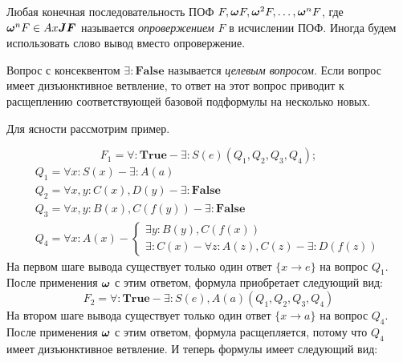 %
Любая конечная последовательность ПОФ $F, \boldsymbol{\omega} F, \boldsymbol{\omega}^2 F,\ldots,\boldsymbol{\omega}^n F$, где $\boldsymbol{\omega}^n F \in Ax\boldsymbol{JF}$ называется {\em опровержением} $F$ в исчислении ПОФ. Иногда будем использовать слово вывод вместо опровержение.

Вопрос с консеквентом $\exists:\boldsymbol{False}$ называется {\em целевым вопросом}. Если вопрос имеет дизъюнктивное ветвление, то ответ на этот вопрос приводит к расщеплению соответствующей базовой подформулы на несколько новых.

Для ясности рассмотрим пример.

\begin{example}\label{proofexample}


\begin{equation*}\label{ex:f1}
	F_1 = \forall\colon\boldsymbol{True} - \exists\colon S(e)(Q_1,Q_2,Q_3,Q_4);
\end{equation*}
\begin{equation*}
	\begin{array}{l}
	Q_1 = \forall x\colon S(x) - \exists\colon A(a) \\
	Q_2 = \forall x,y\colon C(x),D(y) - \exists\colon\boldsymbol{False} \\
	Q_3 = \forall x,y\colon B(x),C(f(y)) - \exists\colon\boldsymbol{False} \\
	Q_4 =
	\forall x\colon A(x) -
	\left\lbrace
	\begin{array}{l}
		\exists y\colon B(y),C(f(x)) \\
		\exists \colon C(x) - \forall z\colon A(z),C(z) - \exists\colon D(f(z))
	\end{array}\right.
	\end{array}
\end{equation*}
На первом шаге вывода существует только один ответ $\{x \rightarrow e\}$ на вопрос $Q_1$. После применения $\boldsymbol{\omega}$ с этим ответом, формула приобретает следующий вид:
\begin{equation*}\label{ex:f2}
	F_2 = \forall\colon\boldsymbol{True} - \exists\colon S(e),A(a)(Q_1,Q_2,Q_3,Q_4)
\end{equation*}
На втором шаге вывода существует только один ответ $\{x \rightarrow a\}$ на вопрос $Q_4$. После применения $\boldsymbol{\omega}$ с этим ответом, формула расщепляется, потому что $Q_4$ имеет дизъюнктивное ветвление. И теперь формулы имеет следующий вид:


\end{example}
